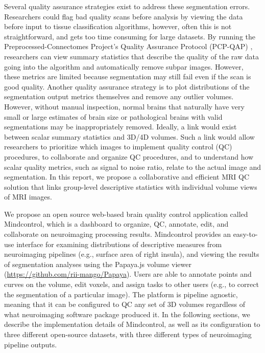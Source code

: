 Several quality assurance strategies exist to address these segmentation errors. Researchers could flag bad quality scans before analysis by viewing the data before input to tissue classification algorithms, however, often this is not straightforward, and gets too time consuming for large datasets. By running the Preprocessed-Connectomes Project’s Quality Assurance Protocol (PCP-QAP) \cite{shehzadpreprocessed}, researchers can view summary statistics that describe the quality of the raw data going into the algorithm and automatically remove subpar images. However, these metrics are limited because segmentation may still fail even if the scan is good quality. Another quality assurance strategy is to plot distributions of the segmentation output metrics themselves and remove any outlier volumes. However, without manual inspection, normal brains that naturally have very small or large estimates of brain size or pathological brains with valid segmentations may be inappropriately removed. Ideally, a link would exist between scalar summary statistics and 3D/4D volumes. Such a link would allow researchers to prioritize which images to implement quality control (QC) procedures, to collaborate and organize QC procedures, and to understand how scalar quality metrics, such as signal to noise ratio, relate to the actual image and segmentation. In this report, we propose a collaborative and efficient MRI QC solution that links group-level descriptive statistics with individual volume views of MRI images.  

We propose an open source web-based brain quality control application called Mindcontrol, which is a dashboard to organize, QC, annotate, edit, and collaborate on neuroimaging processing results. Mindcontrol provides an easy-to-use interface for examining distributions of descriptive measures from neuroimaging pipelines (e.g., surface area of right insula), and viewing the results of segmentation analyses using the Papaya.js volume viewer (\href{https://github.com/rii-mango/Papaya}{https://github.com/rii-mango/Papaya}). Users are able to annotate points and curves on the volume, edit voxels, and assign tasks to other users (e.g., to correct the segmentation of a particular image). The platform is pipeline agnostic, meaning that it can be configured to QC any set of 3D volumes regardless of what neuroimaging software package produced it. In the following sections, we describe the implementation details of Mindcontrol, as well as its configuration to three different open-source datasets, with three different types of neuroimaging pipeline outputs. 

